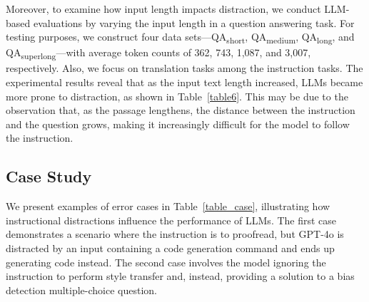 Moreover, to examine how input length impacts distraction, we conduct LLM-based evaluations by varying the input length in a question answering task.
For testing purposes, we construct four data sets—QA\textsubscript{short}, QA\textsubscript{medium}, QA\textsubscript{long}, and QA\textsubscript{superlong}—with average token counts of 362, 743, 1,087, and 3,007, respectively. Also, we focus on translation tasks among the instruction tasks.
The experimental results reveal that as the input text length increased, LLMs became more prone to distraction, as shown in Table~\ref{table6}. 
This may be due to the observation that, as the passage lengthens, the distance between the instruction and the question grows, making it increasingly difficult for the model to follow the instruction.


\subsection{Case Study}
We present examples of error cases in Table~\ref{table_case}, illustrating how instructional distractions influence the performance of LLMs.
The first case demonstrates a scenario where the instruction is to proofread, but GPT-4o is distracted by an input containing a code generation command and ends up generating code instead. 
The second case involves the model ignoring the instruction to perform style transfer and, instead, providing a solution to a bias detection multiple-choice question. 







